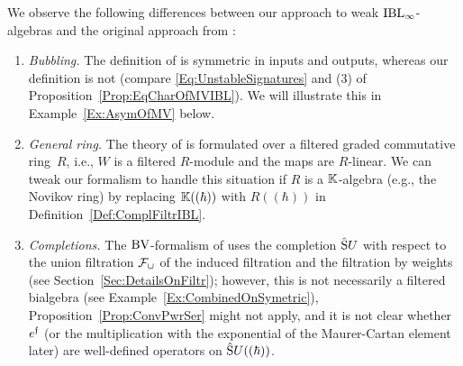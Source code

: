 \documentclass[\MainFolder/Text.tex]{subfiles}
\begin{document}
We observe the following differences between our approach to weak $\mathrm{IBL}_\infty$-algebras and the original approach from \cite{Cieliebak2015}: 

\begin{enumerate}[label=(\roman*)]
\item \emph{Bubbling.} The definition of \cite{Cieliebak2015} is symmetric in inputs and outputs, whereas our definition is not (compare \eqref{Eq:UnstableSignatures} and (3) of Proposition~\ref{Prop:EqCharOfMVIBL}). We will illustrate this in Example~\ref{Ex:AsymOfMV} below.

\item \emph{General ring.} The theory of \cite{Cieliebak2015} is formulated over a filtered graded commutative ring~$R$, i.e., $W$ is a filtered $R$-module and the maps are $R$-linear. We can tweak our formalism to handle this situation if $R$ is a $\mathbb{K}$-algebra (e.g., the Novikov ring) by replacing $\mathbb{K}((\hbar))$ with $R((\hbar))$ in Definition~\ref{Def:ComplFiltrIBL}.

\item \emph{Completions.} The $\mathrm{BV}$-formalism of \cite{Cieliebak2015} uses the completion $\hat{\mathrm{S}}U$ with respect to the union filtration $\mathcal{F}_\cup$ of the induced filtration and the filtration by weights (see Section~\ref{Sec:DetailsOnFiltr}); however, this is not necessarily a filtered bialgebra (see Example~\ref{Ex:CombinedOnSymetric}), Proposition~\ref{Prop:ConvPwrSer} might not apply, and it is not clear whether~$e^{\mathfrak{f}}$ (or the multiplication with the exponential of the Maurer-Cartan element later) are well-defined operators on $\hat{\mathrm{S}}U((\hbar))$.
\end{enumerate}
\end{document}

